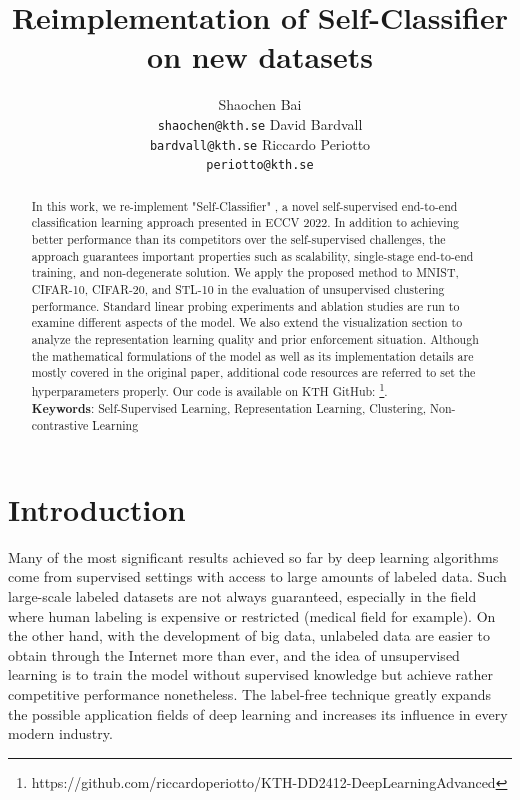 \documentclass{article}
\title{Reimplementation of Self-Classifier on new datasets
}
\author{
    Shaochen Bai        \\ \texttt{shaochen@kth.se} \And 
    David Bardvall      \\ \texttt{bardvall@kth.se} \And 
    Riccardo Periotto   \\ \texttt{periotto@kth.se}
}
\begin{document}

\maketitle

\begin{abstract}
In this work, we re-implement  "Self-Classifier" \cite{self_classifier}, a novel self-supervised end-to-end classification learning approach presented in ECCV 2022. In addition to achieving better performance than its competitors over the self-supervised challenges, the approach guarantees important properties such as scalability, single-stage end-to-end training, and non-degenerate solution. 
We apply the proposed method to MNIST, CIFAR-10, CIFAR-20, and STL-10 in the evaluation of unsupervised clustering performance. Standard linear probing experiments and ablation studies are run to examine different aspects of the model. We also extend the visualization section to analyze the representation learning quality and prior enforcement situation.
Although the mathematical formulations of the model as well as its implementation details are mostly covered in the original paper, additional code resources are referred to set the hyperparameters properly. 
Our code is available on KTH GitHub: \footnote{https://github.com/riccardoperiotto/KTH-DD2412-DeepLearningAdvanced}.  \\

\textbf{Keywords}: Self-Supervised Learning, Representation Learning, Clustering, Non-contrastive Learning
  
\end{abstract}



\section{Introduction}
Many of the most significant results achieved so far by deep learning algorithms come from supervised settings with access to large amounts of labeled data.
Such large-scale labeled datasets are not always guaranteed, especially in the field where human labeling is expensive or restricted (medical field for example).
On the other hand, with the development of big data, unlabeled data are easier to obtain through the Internet more than ever, and the idea of unsupervised learning is to train the model without supervised knowledge but achieve rather competitive performance nonetheless. The label-free technique greatly expands the possible application fields of deep learning and increases its influence in every modern industry.
\end{document}
